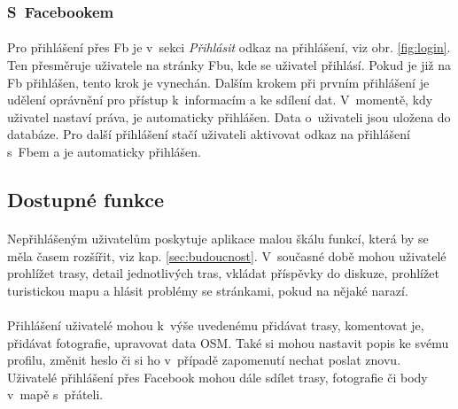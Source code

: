 \documentclass[11pt,a4paper,titlepage,oneside]{book}
\begin{document}
				\subsubsection{S~Facebookem} 
                                

					\paragraph{}Pro přihlášení přes \ac{Fb} je v~sekci \textit{Přihlásit} odkaz na přihlášení, viz obr. \ref{fig:login}. Ten přesměruje uživatele na stránky \acl{Fb}u, kde se uživatel přihlásí. Pokud je již na \ac{Fb} přihlášen, tento krok je vynechán. Dalším krokem při prvním přihlášení je udělení oprávnění pro přístup k~informacím a ke sdílení dat. V~momentě, kdy uživatel nastaví práva, je automaticky přihlášen. Data o~uživateli jsou uložena do databáze. Pro další přihlášení stačí uživateli aktivovat odkaz na přihlášení s~\acl{Fb}em a je automaticky přihlášen.

			\subsection{Dostupné funkce}
				\label{sec:funkce}


				\paragraph{} Nepřihlášeným uživatelům poskytuje aplikace malou škálu funkcí, která by se měla časem rozšířit, viz kap. \ref{sec:budoucnost}. V~současné době mohou uživatelé prohlí\-žet trasy, detail jednotlivých tras, vkládat příspěvky do diskuze, prohlí\-žet turistickou mapu a hlásit problémy se stránkami, pokud na nějaké narazí.
				\paragraph{} Přihlášení uživatelé mohou k~výše uvedenému přidávat trasy, komentovat je, přidávat fotografie, upravovat data \acl{OSM}. Také si mohou nastavit popis ke svému profilu, změnit heslo či si ho v~případě zapomenutí nechat poslat znovu. Uživatelé přihlášení přes Facebook mohou dále sdílet trasy, fotografie či body v~mapě s~přáteli.
\end{document}
